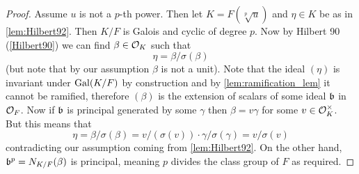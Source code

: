 \begin{proof}
	Assume $u$ is not a $p$-th power. Then let $K=F(\sqrt[p]{u})$  and $\eta \in K$ be as in \ref{lem:Hilbert92}. Then $K/F$ is Galois and cyclic of degree $p$. Now by Hilbert 90 (\ref{Hilbert90})  we can find $\beta \in \mathcal{O}_K$ such that \[\eta = \beta/\sigma(\beta)\] (but note that by our assumption $\beta$ is not a unit). Note that the ideal $(\eta)$ is invariant under $\operatorname{Gal}(K/F)$ by construction and by \ref{lem:ramification_lem} it cannot be ramified, therefore $(\beta)$ is the extension of scalars of some ideal $\mathfrak{b}$ in $\mathcal{O}_F$. Now if $\mathfrak{b}$ is principal generated by some $\gamma$ then $\beta=v \gamma$  for some $v \in \mathcal{O}_K^\times$.
	But this means that \[\eta = \beta/\sigma(\beta)= v/(\sigma(v)) \cdot \gamma / \sigma(\gamma)=v/\sigma(v)  \] contradicting our assumption coming from \ref{lem:Hilbert92}. On the other hand, $\mathfrak{b}^p= N_{K/F}(\beta)$ is principal, meaning $p$ divides the class group of $F$ as required.

\end{proof}

